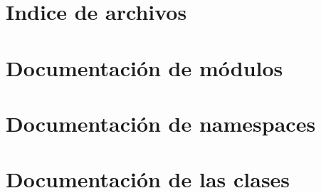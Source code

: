 \let\mypdfximage\pdfximage\def\pdfximage{\immediate\mypdfximage}\documentclass[twoside]{book}
\newcommand{\+}{\discretionary{\mbox{\scriptsize$\hookleftarrow$}}{}{}}
\begin{document}
\chapter{Indice de archivos}

\chapter{Documentación de módulos}


\chapter{Documentación de namespaces}



\chapter{Documentación de las clases}














































\end{document}
